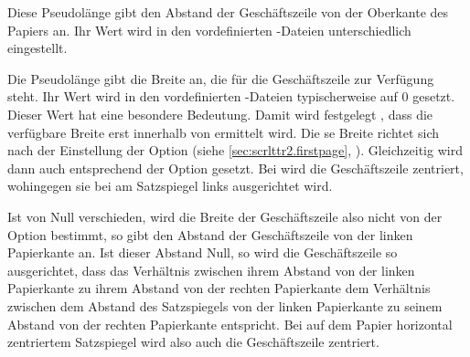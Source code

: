 \begin{Declaration}
\end{Declaration}
Diese Pseudolänge gibt den Abstand der Geschäftszeile von der Oberkante des
Papiers an. Ihr Wert wird in den vordefinierten -Dateien
unterschiedlich eingestellt. %
\iffalse%
Typische Werte liegen zwischen 80{,}5\Unit{mm} und 98{,}5\Unit{mm}.%
\fi%
\EndIndexGroup


\begin{Declaration}
\end{Declaration}
Die Pseudolänge  gibt die Breite an, die für die
Geschäftszeile zur Verfügung steht. Ihr Wert wird in den vordefinierten
-Dateien typischerweise auf 0
gesetzt. Dieser Wert hat eine besondere Bedeutung. %
\iffalse%
Es wird damit keineswegs festgelegt, dass für die Geschäftszeile keine Breite
zur Verfügung steht. Vielmehr bedeutet der Wert%
\else%
Damit wird festgelegt%
\fi%
, dass die verfügbare Breite erst innerhalb von
 ermittelt wird.  Die%
\iffalse%
\ dort ermittelte %
\else%
se %
\fi%
Breite richtet sich nach der Einstellung der Option
%
 (siehe
\autoref{sec:scrlttr2.firstpage},
). Gleichzeitig wird dann auch
 entsprechend der Option gesetzt. Bei
%
 wird die Geschäftszeile zentriert,
wohingegen sie bei %
 am Satzspiegel links ausgerichtet
wird.

Ist  von Null verschieden, wird die Breite der
Geschäftszeile also nicht von der Option 
bestimmt, so gibt  den Abstand der Geschäftszeile von der
linken Papierkante an. Ist dieser Abstand Null, so wird die
Geschäftszeile so ausgerichtet, dass das Verhältnis zwischen ihrem Abstand von
der linken Papierkante zu ihrem Abstand von der rechten Papierkante dem
Verhältnis zwischen dem Abstand des Satzspiegels von der linken Papierkante zu
seinem Abstand von der rechten Papierkante entspricht. Bei auf dem Papier
horizontal zentriertem Satzspiegel wird also auch die Geschäftszeile
zentriert.

